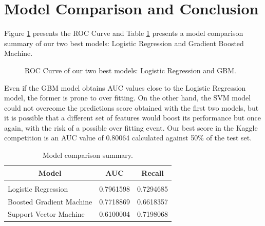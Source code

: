 \documentclass{article} %
\begin{document}
\section{Model Comparison and Conclusion}

Figure \ref{figure:1} presents the ROC Curve and Table \ref{table:29} presents a model comparison summary of our two best models: Logistic Regression and Gradient Boosted Machine.

\begin{figure}[!htpb]
\begin{center}
\end{center}
\caption{ROC Curve of our two best models: Logistic Regression and GBM.}
\label{figure:1}
\end{figure}

Even if the GBM model obtains AUC values close to the Logistic Regression model, the former is prone to over fitting. On the other hand, the SVM model could not overcome the predictions score obtained with the first two models, but it is possible that a different set of features would boost its performance but once again, with the risk of a possible over fitting event. Our best score in the Kaggle competition is an AUC value of 0.80064 calculated against 50\% of the test set.

\begin{table}[!htpb]
\caption{Model comparison summary.}
\label{table:29}
\begin{center}
\begin{tabular}{l l l}
\multicolumn{1}{c}{\bf Model} & \multicolumn{1}{c}{\bf AUC} & \multicolumn{1}{c}{\bf Recall}
\\ \hline \\
Logistic Regression      & 0.7961598 & 0.7294685\\
Boosted Gradient Machine & 0.7718869 & 0.6618357\\
Support Vector Machine   & 0.6100004 & 0.7198068\\
\end{tabular}
\end{center}
\end{table}
\printbibliography
\end{document}
